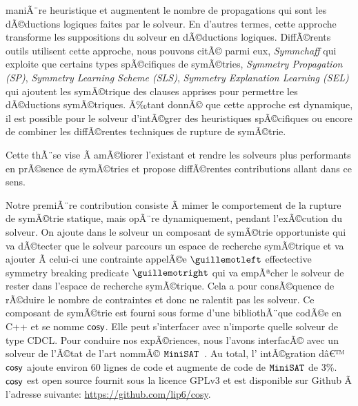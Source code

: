 maniÃ¨re heuristique et augmentent le nombre de propagations qui sont les dÃ©ductions logiques faites par le solveur. 
En d'autres termes, cette approche transforme les suppositions du solveur en dÃ©ductions logiques.
DiffÃ©rents outils utilisent cette approche, nous pouvons citÃ© parmi eux, \textit{Symmchaff}
qui exploite que certains types spÃ©cifiques de symÃ©tries, \textit{Symmetry Propagation (SP)}, \textit{Symmetry Learning Scheme (SLS)}, \textit{Symmetry Explanation Learning (SEL)} qui ajoutent les symÃ©trique des
clauses apprises pour permettre les dÃ©ductions symÃ©triques.
Ã‰tant donnÃ© que cette approche est dynamique, il est possible pour le solveur 
d'intÃ©grer des heuristiques spÃ©cifiques ou encore de combiner les diffÃ©rentes techniques de rupture de symÃ©trie.

Cette thÃ¨se vise Ã  amÃ©liorer l'existant et rendre les solveurs plus performants en prÃ©sence de symÃ©tries et
propose diffÃ©rentes contributions allant dans ce sens.  

Notre premiÃ¨re contribution consiste Ã  mimer le comportement de la rupture de symÃ©trie statique, mais 
opÃ¨re dynamiquement, pendant l'exÃ©cution du solveur. On ajoute dans le solveur un composant de symÃ©trie opportuniste qui va dÃ©tecter que le solveur parcours un espace de recherche symÃ©trique et va ajouter Ã  celui-ci une contrainte appelÃ©e $\guillemotleft$ effectective symmetry breaking predicate $\guillemotright$ qui va empÃªcher le solveur de rester dans
l'espace de recherche symÃ©trique. Cela a pour consÃ©quence de rÃ©duire le nombre de contraintes et donc 
ne ralentit pas les solveur.
Ce composant de symÃ©trie est fourni sous forme d'une bibliothÃ¨que codÃ©e en C++ et se nomme $\textsf{cosy}$.
Elle peut s'interfacer avec n'importe quelle solveur de type CDCL. 
Pour conduire nos expÃ©riences, nous l'avons interfacÃ© avec un solveur de l'Ã©tat de l'art nommÃ© $\texttt{MiniSAT}$~\cite{een2003extensible}. Au total, l' intÃ©gration dâ€™ $\textsf{cosy}$ ajoute environ 60 lignes de code 
et augmente de code de $\texttt{MiniSAT}$ de 3\%.
$\textsf{cosy}$ est open source fournit sous la licence GPLv3 et est disponible sur Github Ã  l'adresse suivante: \url{https://github.com/lip6/cosy}.

